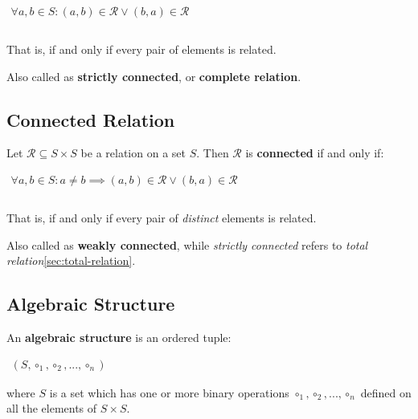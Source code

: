 \begin{math}
  \begin{array}{c}
    \forall a, b \in S : (a, b) \in \mathcal{R} \lor (b, a) \in \mathcal{R} \\
    \\
  \end{array}
\end{math}

That is, if and only if every pair of elements is related.

Also called as \textbf{strictly connected}, or \textbf{complete
  relation}.

\subsection{Connected Relation}
\label{sec:connected-relation}

Let $\mathcal{R} \subseteq S \times S$ be a relation on a set
$S$. Then $\mathcal{R}$ is \textbf{connected} if and only if:

\begin{math}
  \begin{array}{c}
    \forall a, b \in S: a \neq b \implies (a, b) \in \mathcal{R} \lor (b,a) \in \mathcal{R} \\
    \\
  \end{array}
\end{math}


That is, if and only if every pair of \textit{distinct} elements is
related.


Also called as \textbf{weakly connected}, while \textit{strictly
  connected} refers to \textit{total
  relation}\ref{sec:total-relation}.



\subsection{Algebraic Structure}
\label{sec:algebraic-structure}

An \textbf{algebraic structure} is an ordered tuple:

\begin{math}
  \begin{array}{c}
    (S, \circ_1, \circ_2, ..., \circ_n)
  \end{array}
\end{math}

where $S$ is a set which has one or more binary operations
$\circ_1, \circ_2, ..., \circ_n$ defined on all the elements of
$S \times S$.

